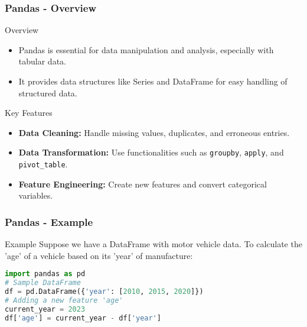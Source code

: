 \documentclass[aspectratio=169]{beamer}
\begin{document}
\begin{frame}[fragile]
    \frametitle{Pandas - Overview}
    \begin{block}{Overview}
        \begin{itemize}
            \item Pandas is essential for data manipulation and analysis, especially with tabular data.
            \item It provides data structures like Series and DataFrame for easy handling of structured data.
        \end{itemize}
    \end{block}

    \begin{block}{Key Features}
        \begin{itemize}
            \item \textbf{Data Cleaning:} Handle missing values, duplicates, and erroneous entries.
            \item \textbf{Data Transformation:} Use functionalities such as \texttt{groupby}, \texttt{apply}, and \texttt{pivot\_table}.
            \item \textbf{Feature Engineering:} Create new features and convert categorical variables.
        \end{itemize}
    \end{block}
\end{frame}

\begin{frame}[fragile]
    \frametitle{Pandas - Example}
    \begin{block}{Example}
        Suppose we have a DataFrame with motor vehicle data. To calculate the 'age' of a vehicle based on its 'year' of manufacture:

        \begin{lstlisting}[language=Python]
import pandas as pd
# Sample DataFrame
df = pd.DataFrame({'year': [2010, 2015, 2020]})
# Adding a new feature 'age'
current_year = 2023
df['age'] = current_year - df['year']
        \end{lstlisting}
    \end{block}
\end{frame}
\end{document}
